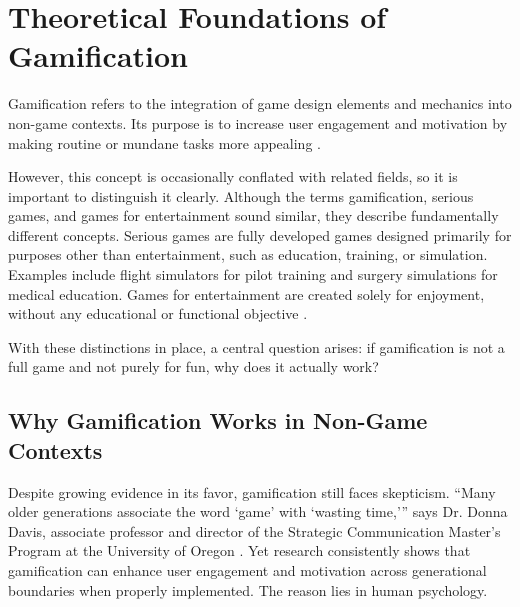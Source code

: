 \section{Theoretical Foundations of Gamification}

Gamification refers to the integration of game design elements and mechanics into non-game contexts.
Its purpose is to increase user engagement and motivation by making routine or mundane tasks more appealing \cite{gablerGamification, grendelGamification}.

However, this concept is occasionally conflated with related fields, so it is important to distinguish it clearly. Although the terms gamification, serious games, and games for entertainment sound similar, they describe fundamentally different concepts. Serious games are fully developed games designed primarily for purposes other than entertainment, such as education, training, or simulation. Examples include flight simulators for pilot training and surgery simulations for medical education.
Games for entertainment are created solely for enjoyment, without any educational or functional objective \cite{MDPI}.

With these distinctions in place, a central question arises: if gamification is not a full game and not purely for fun, why does it actually work?

\subsection{Why Gamification Works in Non-Game Contexts}

Despite growing evidence in its favor, gamification still faces skepticism. ``Many older generations associate the word `game' with `wasting time,''' says Dr. Donna Davis, associate professor and director of the Strategic Communication Master's Program at the University of Oregon \cite{salesscreenOlderGenerations}. Yet research consistently shows that gamification can enhance user engagement and motivation across generational boundaries when properly implemented. The reason lies in human psychology.

